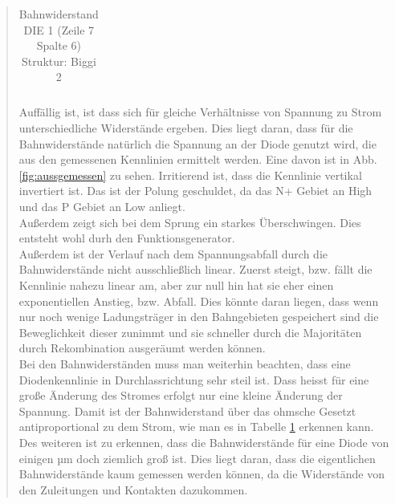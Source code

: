 \begin{quote}
\begin{table}[H]
\begin{addmargin}[3cm]{3cm}
\begin{tabular}{|p{3cm}|p{3cm}|p{3cm}|}
                    \end{tabular}
              \end{addmargin}
              \caption{Bahnwiderstand DIE 1 (Zeile 7 Spalte 6) Struktur: Biggi 2}
              \label{tab:bahnwid}
            \end{table}

    \vspace{2em}
	
	Auffällig ist, ist dass sich für gleiche Verhältnisse von Spannung zu Strom
	unterschiedliche Widerstände ergeben. Dies liegt daran, dass für die 
	Bahnwiderstände natürlich die Spannung an der Diode genutzt wird, die aus 
	den gemessenen Kennlinien ermittelt werden. Eine davon ist in Abb.
	\ref{fig:aussgemessen} zu sehen. Irritierend ist, dass die Kennlinie 
	vertikal invertiert ist. Das ist der Polung geschuldet, da das N+ Gebiet an 
	High und das P Gebiet an Low anliegt.\\
	Außerdem zeigt sich bei dem Sprung ein starkes Überschwingen. Dies entsteht 
	wohl durh den Funktionsgenerator.\\ 
	Außerdem ist der Verlauf nach dem Spannungsabfall durch die Bahnwiderstände
	nicht ausschließlich linear. Zuerst steigt, bzw. fällt die Kennlinie nahezu
	linear am, aber zur null hin hat sie eher einen exponentiellen Anstieg, bzw.
	Abfall. Dies könnte daran liegen, dass wenn nur noch wenige Ladungsträger
	in den Bahngebieten gespeichert sind die Beweglichkeit dieser zunimmt und 
	sie schneller durch die Majoritäten durch Rekombination ausgeräumt werden 
	können.\\
	Bei den Bahnwiderständen muss man weiterhin beachten, dass eine 
	Diodenkennlinie in Durchlassrichtung sehr steil ist. Dass heisst für eine 
	große Änderung des Stromes erfolgt nur eine kleine Änderung der Spannung. 
	Damit ist der Bahnwiderstand über das ohmsche Gesetzt antiproportional zu 
	dem Strom, wie man es in Tabelle \ref{tab:bahnwid} erkennen kann.\\
	Des weiteren ist zu erkennen, dass die Bahnwiderstände für eine Diode von 
	einigen µm doch ziemlich groß ist. Dies liegt daran, dass die eigentlichen 
	Bahnwiderstände kaum gemessen werden können, da die Widerstände von den 
	Zuleitungen und Kontakten dazukommen.
	
	\vspace{2em}
	

\end{quote}
